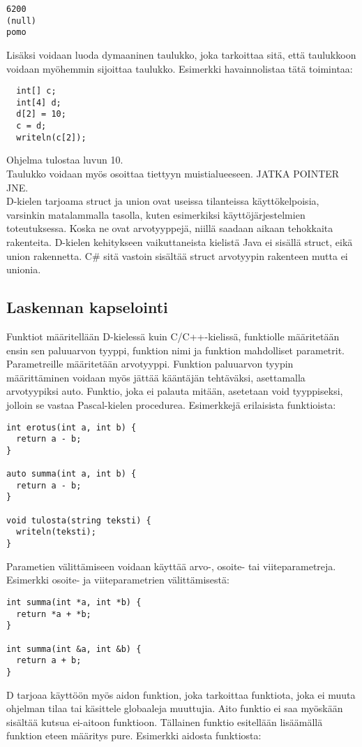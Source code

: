 \documentclass[11pt,oneside,a4paper]{article}
\begin{document}
\begin{verbatim}
6200
(null)
pomo
\end{verbatim}

Lisäksi voidaan luoda dymaaninen taulukko, joka tarkoittaa sitä, että taulukkoon voidaan myöhemmin sijoittaa taulukko. Esimerkki havainnolistaa tätä toimintaa:

\begin{verbatim}
  int[] c;
  int[4] d;
  d[2] = 10;
  c = d;
  writeln(c[2]);
\end{verbatim}
Ohjelma tulostaa luvun 10. \\
Taulukko voidaan myös osoittaa tiettyyn muistialueeseen. JATKA POINTER JNE. \\


D-kielen tarjoama struct ja union ovat useissa tilanteissa käyttökelpoisia, varsinkin matalammalla tasolla, kuten esimerkiksi käyttöjärjestelmien toteutuksessa. Koska ne ovat arvotyyppejä, niillä saadaan aikaan tehokkaita rakenteita. D-kielen kehitykseen vaikuttaneista kielistä Java ei sisällä struct, eikä union rakennetta. C\# sitä vastoin sisältää struct arvotyypin rakenteen mutta ei unionia.

\subsection{Laskennan kapselointi}

Funktiot määritellään D-kielessä kuin C/C++-kielissä, funktiolle määritetään ensin sen paluuarvon tyyppi, funktion nimi ja funktion mahdolliset parametrit. Parametreille määritetään arvotyyppi. Funktion paluuarvon tyypin määrittäminen voidaan myös jättää kääntäjän tehtäväksi, asettamalla arvotyypiksi auto. Funktio, joka ei palauta mitään, asetetaan void tyyppiseksi, jolloin se vastaa Pascal-kielen procedurea. Esimerkkejä erilaisista funktioista:

\begin{verbatim}
int erotus(int a, int b) {
  return a - b;
}

auto summa(int a, int b) {
  return a - b;
}

void tulosta(string teksti) {
  writeln(teksti);
}
\end{verbatim}

Parametien välittämiseen voidaan käyttää arvo-, osoite- tai viiteparametreja. Esimerkki osoite- ja viiteparametrien välittämisestä:
\begin{verbatim}
int summa(int *a, int *b) {
  return *a + *b;
}

int summa(int &a, int &b) {
  return a + b;
}
\end{verbatim} 
D tarjoaa käyttöön myös aidon funktion, joka tarkoittaa funktiota, joka ei muuta ohjelman tilaa tai käsittele globaaleja muuttujia. Aito funktio ei saa myöskään sisältää kutsua ei-aitoon funktioon. Tällainen funktio esitellään lisäämällä funktion eteen määritys pure. Esimerkki aidosta funktiosta:
\end{document}
